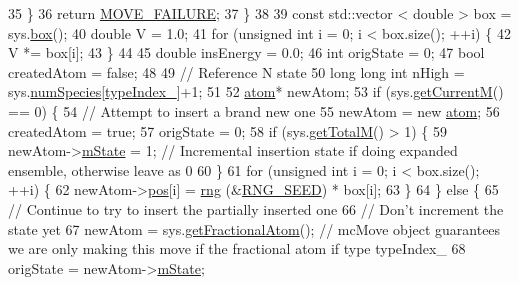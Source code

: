 \begin{DoxyCode}
35         \}
36         \textcolor{keywordflow}{return} \hyperlink{moves_8h_a9832cf5fcfa8c0894545b591c9908e39}{MOVE\_FAILURE};
37     \}
38 
39     \textcolor{keyword}{const} std::vector < double > box = sys.\hyperlink{classsim_system_a8bff9dfb95b1b09a0fab2c1c485ade07}{box}();
40     \textcolor{keywordtype}{double} V = 1.0;
41     \textcolor{keywordflow}{for} (\textcolor{keywordtype}{unsigned} \textcolor{keywordtype}{int} i = 0; i < box.size(); ++i) \{
42         V *= box[i];
43     \}
44 
45     \textcolor{keywordtype}{double} insEnergy = 0.0;
46     \textcolor{keywordtype}{int} origState = 0;
47     \textcolor{keywordtype}{bool} createdAtom = \textcolor{keyword}{false};
48 
49     \textcolor{comment}{// Reference N state}
50     \textcolor{keywordtype}{long} \textcolor{keywordtype}{long} \textcolor{keywordtype}{int} nHigh = sys.\hyperlink{classsim_system_a9eea865e6dc1cff377b1e79c4d9c23f0}{numSpecies}[\hyperlink{classmc_move_acb731965547b0326ef318ec96da8b46a}{typeIndex\_}]+1;
51 
52     \hyperlink{classatom}{atom}* newAtom;
53     \textcolor{keywordflow}{if} (sys.\hyperlink{classsim_system_a299fe4372e610b554eaaf5f5957b2dbc}{getCurrentM}() == 0) \{
54         \textcolor{comment}{// Attempt to insert a brand new one}
55         newAtom = \textcolor{keyword}{new} \hyperlink{classatom}{atom};
56         createdAtom = \textcolor{keyword}{true};
57         origState = 0;
58         \textcolor{keywordflow}{if} (sys.\hyperlink{classsim_system_aa4ad1afff101bb530e1590df05035276}{getTotalM}() > 1) \{
59             newAtom->\hyperlink{classatom_a3cb00c0c5b7533657e05af6ff4a42740}{mState} = 1; \textcolor{comment}{// Incremental insertion state if doing expanded ensemble, otherwise
       leave as 0}
60         \}
61         \textcolor{keywordflow}{for} (\textcolor{keywordtype}{unsigned} \textcolor{keywordtype}{int} i = 0; i < box.size(); ++i) \{
62             newAtom->\hyperlink{classatom_a3ae5f4880e7831d8b2c9fda72b4eb24a}{pos}[i] = \hyperlink{utilities_8cpp_a0f9542af4b475ac79cb679d7a8d14db0}{rng} (&\hyperlink{global_8h_a3f4e4ea24d5a5c66feae55d1f329c884}{RNG\_SEED}) * box[i];
63         \}
64     \} \textcolor{keywordflow}{else} \{
65         \textcolor{comment}{// Continue to try to insert the partially inserted one}
66         \textcolor{comment}{// Don't increment the state yet}
67         newAtom = sys.\hyperlink{classsim_system_a2ab77377c60e0e3109a6e875690b0ab7}{getFractionalAtom}(); \textcolor{comment}{// mcMove object guarantees we are only making
       this move if the fractional atom if type typeIndex\_}
68         origState = newAtom->\hyperlink{classatom_a3cb00c0c5b7533657e05af6ff4a42740}{mState};

\end{DoxyCode}
